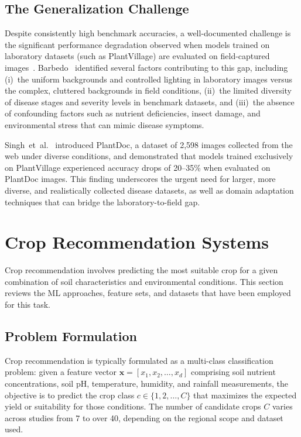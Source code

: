 \documentclass[journal]{IEEEtran}
\begin{document}
\subsection{The Generalization Challenge}

Despite consistently high benchmark accuracies, a well-documented challenge is the significant performance degradation observed when models trained on laboratory datasets (such as PlantVillage) are evaluated on field-captured images~\cite{barbedo2018factors,barbedo2019plant}. Barbedo~\cite{barbedo2018factors} identified several factors contributing to this gap, including (i)~the uniform backgrounds and controlled lighting in laboratory images versus the complex, cluttered backgrounds in field conditions, (ii)~the limited diversity of disease stages and severity levels in benchmark datasets, and (iii)~the absence of confounding factors such as nutrient deficiencies, insect damage, and environmental stress that can mimic disease symptoms.

Singh~et~al.~\cite{singh2018plantdoc} introduced PlantDoc, a dataset of 2,598 images collected from the web under diverse conditions, and demonstrated that models trained exclusively on PlantVillage experienced accuracy drops of 20--35\% when evaluated on PlantDoc images. This finding underscores the urgent need for larger, more diverse, and realistically collected disease datasets, as well as domain adaptation techniques that can bridge the laboratory-to-field gap.


\section{Crop Recommendation Systems}
\label{sec:recommendation}

Crop recommendation involves predicting the most suitable crop for a given combination of soil characteristics and environmental conditions. This section reviews the ML approaches, feature sets, and datasets that have been employed for this task.

\subsection{Problem Formulation}

Crop recommendation is typically formulated as a multi-class classification problem: given a feature vector $\mathbf{x} = [x_1, x_2, \ldots, x_d]$ comprising soil nutrient concentrations, soil pH, temperature, humidity, and rainfall measurements, the objective is to predict the crop class $c \in \{1, 2, \ldots, C\}$ that maximizes the expected yield or suitability for those conditions. The number of candidate crops $C$ varies across studies from 7 to over 40, depending on the regional scope and dataset used.
\end{document}
